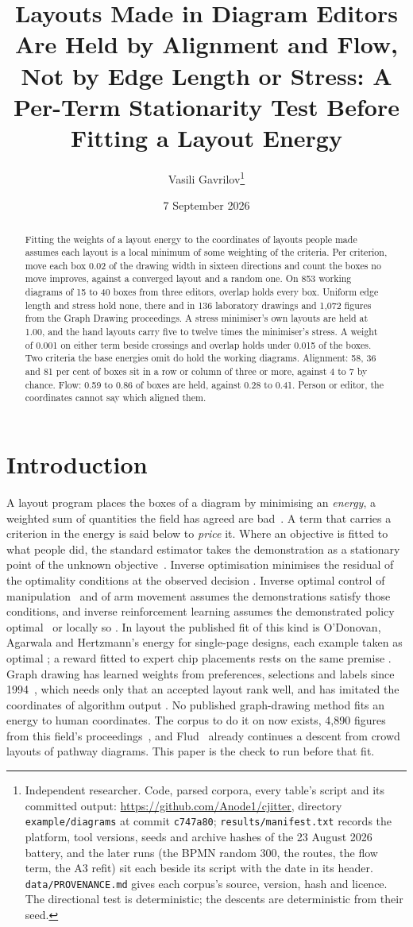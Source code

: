 \documentclass[11pt]{article}
\title{\textbf{Layouts Made in Diagram Editors Are Held by Alignment and Flow, Not by Edge
Length or Stress: A Per-Term Stationarity Test Before Fitting a Layout Energy}}
\author{Vasili Gavrilov\thanks{Independent researcher. Code, parsed corpora, every table's
script and its committed output: \url{https://github.com/Anode1/cjitter}, directory
\texttt{example/diagrams} at commit \texttt{c747a80};
\texttt{results/manifest.txt} records the platform, tool versions, seeds and archive
hashes of the 23 August 2026 battery, and the later runs (the BPMN random 300, the routes,
the flow term, the A3 refit) sit each beside its script with the date in its header.
\texttt{data/PROVENANCE.md} gives each corpus's source, version, hash and licence. The directional test is deterministic; the descents are deterministic from
their seed.}}
\date{7 September 2026}
\begin{document}
\maketitle

\begin{abstract}
Fitting the weights of a layout energy to the coordinates of layouts people made assumes
each layout is a local minimum of some weighting of the criteria. Per criterion, move
each box 0.02 of the drawing width in sixteen directions and count the boxes no move
improves, against a converged layout and a random one. On 853 working diagrams of 15 to 40
boxes from three editors, overlap holds every box. Uniform edge length and stress hold
none, there and in 136 laboratory drawings and 1,072 figures from the Graph Drawing
proceedings. A stress minimiser's own layouts are held at 1.00, and the hand layouts carry
five to twelve times the minimiser's stress. A weight of 0.001 on either term beside
crossings and overlap holds under 0.015 of the boxes. Two criteria the base energies omit
do hold the working diagrams. Alignment: 58, 36 and 81 per cent of boxes sit in a row or
column of three or more, against 4 to 7 by chance. Flow: 0.59 to 0.86 of boxes are held,
against 0.28 to 0.41. Person or editor, the coordinates cannot say which aligned them.
\end{abstract}

\section{Introduction}\label{sec:intro}

A layout program places the boxes of a diagram by minimising an \emph{energy}, a weighted
sum of quantities the field has agreed are bad~\cite{tdb88, dh96, purchase02, kobourov}. A
term that carries a criterion in the energy is said below to \emph{price} it. Where an
objective is fitted to what people did, the standard estimator takes the demonstration as
a stationary point of the unknown objective~\cite{ahuja01}. Inverse optimisation minimises
the residual of the optimality conditions at the observed decision \cite{keshavarz11, chan19}. Inverse optimal control of manipulation~\cite{englert17} and of arm movement
\cite{berret11} assumes the demonstrations satisfy those conditions, and inverse
reinforcement learning assumes the demonstrated policy optimal~\cite{ng00} or locally so
\cite{levine12}. In layout the published fit of this kind is O'Donovan, Agarwala and
Hertzmann's energy for single-page designs, each example taken as optimal
\cite{odonovan14}; a reward fitted to expert chip placements rests on the same premise
\cite{chen26}. Graph drawing has learned weights from preferences, selections and labels
since 1994~\cite{masui94, spoenemann14, klammler19, zhang26}, which needs only that an
accepted layout rank well, and has imitated the coordinates of algorithm output
\cite{smartgd24, deepdrawing19}. No published graph-drawing method fits an energy to human
coordinates. The corpus to do it on now exists, 4,890 figures from this field's
proceedings~\cite{gdcoll25}, and Flud~\cite{flud22} already continues a descent from crowd
layouts of pathway diagrams. This paper is the check to run before that fit.
\end{document}
